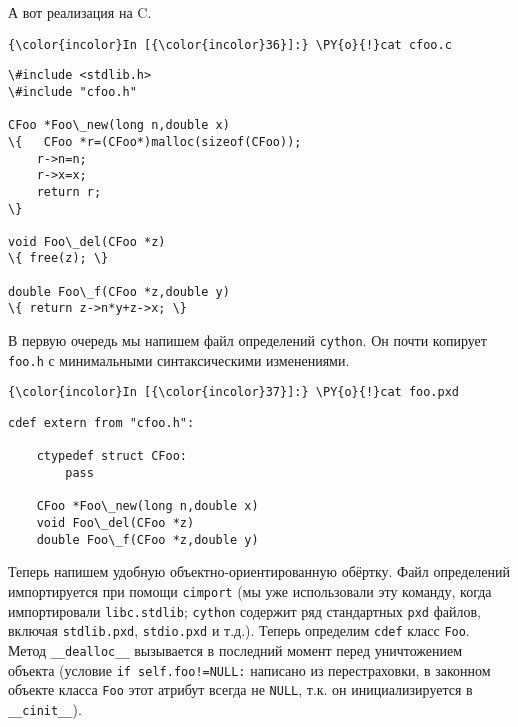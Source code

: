 А вот реализация на C.

    \begin{Verbatim}[commandchars=\\\{\}]
{\color{incolor}In [{\color{incolor}36}]:} \PY{o}{!}cat cfoo.c
\end{Verbatim}

    \begin{Verbatim}[commandchars=\\\{\}]
\#include <stdlib.h>
\#include "cfoo.h"

CFoo *Foo\_new(long n,double x)
\{   CFoo *r=(CFoo*)malloc(sizeof(CFoo));
    r->n=n;
    r->x=x;
    return r;
\}

void Foo\_del(CFoo *z)
\{ free(z); \}

double Foo\_f(CFoo *z,double y)
\{ return z->n*y+z->x; \}

    \end{Verbatim}

    В первую очередь мы напишем файл определений \texttt{cython}. Он почти
копирует \texttt{foo.h} с минимальными синтаксическими изменениями.

    \begin{Verbatim}[commandchars=\\\{\}]
{\color{incolor}In [{\color{incolor}37}]:} \PY{o}{!}cat foo.pxd
\end{Verbatim}

    \begin{Verbatim}[commandchars=\\\{\}]
cdef extern from "cfoo.h":

    ctypedef struct CFoo:
        pass

    CFoo *Foo\_new(long n,double x)
    void Foo\_del(CFoo *z)
    double Foo\_f(CFoo *z,double y)

    \end{Verbatim}

    Теперь напишем удобную объектно-ориентированную обёртку. Файл
определений импортируется при помощи \texttt{cimport} (мы уже
использовали эту команду, когда импортировали \texttt{libc.stdlib};
\texttt{cython} содержит ряд стандартных \texttt{pxd} файлов, включая
\texttt{stdlib.pxd}, \texttt{stdio.pxd} и т.д.). Теперь определим
\texttt{cdef} класс \texttt{Foo}. Метод \texttt{\_\_dealloc\_\_}
вызывается в последний момент перед уничтожением объекта (условие
\texttt{if\ self.foo!=NULL:} написано из перестраховки, в законном
объекте класса \texttt{Foo} этот атрибут всегда не \texttt{NULL}, т.к.
он инициализируется в \texttt{\_\_cinit\_\_}).

